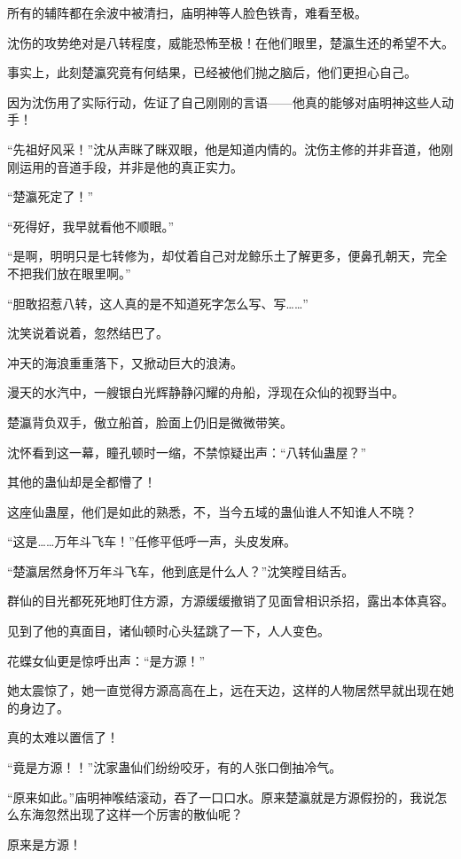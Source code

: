 \begin{this_body}
所有的辅阵都在余波中被清扫，庙明神等人脸色铁青，难看至极。

沈伤的攻势绝对是八转程度，威能恐怖至极！在他们眼里，楚瀛生还的希望不大。

事实上，此刻楚瀛究竟有何结果，已经被他们抛之脑后，他们更担心自己。

因为沈伤用了实际行动，佐证了自己刚刚的言语——他真的能够对庙明神这些人动手！

“先祖好风采！”沈从声眯了眯双眼，他是知道内情的。沈伤主修的并非音道，他刚刚运用的音道手段，并非是他的真正实力。

“楚瀛死定了！”

“死得好，我早就看他不顺眼。”

“是啊，明明只是七转修为，却仗着自己对龙鲸乐土了解更多，便鼻孔朝天，完全不把我们放在眼里啊。”

“胆敢招惹八转，这人真的是不知道死字怎么写、写……”

沈笑说着说着，忽然结巴了。

冲天的海浪重重落下，又掀动巨大的浪涛。

漫天的水汽中，一艘银白光辉静静闪耀的舟船，浮现在众仙的视野当中。

楚瀛背负双手，傲立船首，脸面上仍旧是微微带笑。

沈怀看到这一幕，瞳孔顿时一缩，不禁惊疑出声：“八转仙蛊屋？”

其他的蛊仙却是全都懵了！

这座仙蛊屋，他们是如此的熟悉，不，当今五域的蛊仙谁人不知谁人不晓？

“这是……万年斗飞车！”任修平低呼一声，头皮发麻。

“楚瀛居然身怀万年斗飞车，他到底是什么人？”沈笑瞠目结舌。

群仙的目光都死死地盯住方源，方源缓缓撤销了见面曾相识杀招，露出本体真容。

见到了他的真面目，诸仙顿时心头猛跳了一下，人人变色。

花蝶女仙更是惊呼出声：“是方源！”

她太震惊了，她一直觉得方源高高在上，远在天边，这样的人物居然早就出现在她的身边了。

真的太难以置信了！

“竟是方源！！”沈家蛊仙们纷纷咬牙，有的人张口倒抽冷气。

“原来如此。”庙明神喉结滚动，吞了一口口水。原来楚瀛就是方源假扮的，我说怎么东海忽然出现了这样一个厉害的散仙呢？

原来是方源！


\end{this_body}
